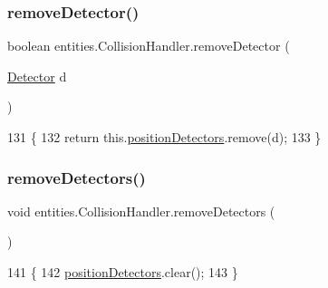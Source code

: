\subsubsection{\texorpdfstring{remove\+Detector()}{removeDetector()}}
{\footnotesize\ttfamily boolean entities.\+Collision\+Handler.\+remove\+Detector (\begin{DoxyParamCaption}\item[{\mbox{\hyperlink{interfacedetectors_1_1_detector}{Detector}}}]{d }\end{DoxyParamCaption})\hspace{0.3cm}{\ttfamily [inline]}}


\begin{DoxyCode}
131                                               \{
132         \textcolor{keywordflow}{return} this.\mbox{\hyperlink{classentities_1_1_collision_handler_ac8a71d4c1785179065bb3461aae87a1f}{positionDetectors}}.remove(d);
133     \}
\end{DoxyCode}
\mbox{\label{classentities_1_1_collision_handler_a305659bc4ab9c4f6c228214e67f92c5b}} 
\subsubsection{\texorpdfstring{remove\+Detectors()}{removeDetectors()}}
{\footnotesize\ttfamily void entities.\+Collision\+Handler.\+remove\+Detectors (\begin{DoxyParamCaption}{ }\end{DoxyParamCaption})\hspace{0.3cm}{\ttfamily [inline]}}


\begin{DoxyCode}
141                                   \{
142         \mbox{\hyperlink{classentities_1_1_collision_handler_ac8a71d4c1785179065bb3461aae87a1f}{positionDetectors}}.clear();
143     \}
\end{DoxyCode}
\mbox{\label{classentities_1_1_collision_handler_a8a5ec46b78904315d4ff7becc8da2f5d}} 
